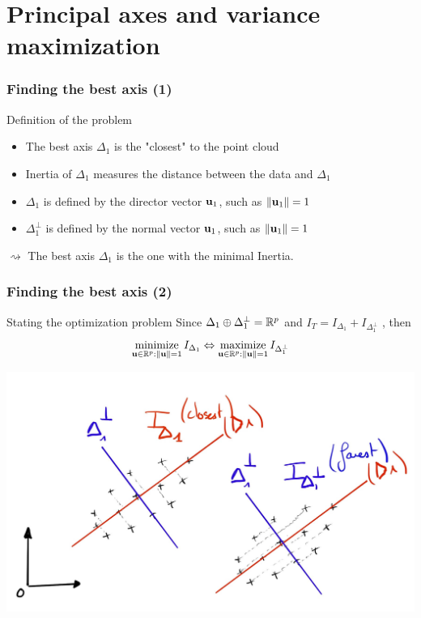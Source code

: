 \documentclass{beamer}\usepackage[]{graphicx}\usepackage[]{color}
\begin{document}
\section{Principal axes and variance maximization}

\begin{frame}
  \frametitle{Finding the best axis (1)}

  \begin{block}{Definition of the problem}
    \begin{itemize}
      \item The best axis $\Delta_1$ is the "closest" to the point cloud
      \item Inertia of $\Delta_1$ measures the distance between the data and $\Delta_1$
      \item $\Delta_1$ is defined by the director vector $\mathbf{u}_1$, such as $\| \mathbf{u}_1 \| = 1$
      \item $\Delta_1^\bot$ is defined by the normal  vector $\mathbf{u}_1$, such as $\| \mathbf{u}_1 \| = 1$
    \end{itemize}
    \alert{$\rightsquigarrow$ The best axis $\Delta_1$ is the one with the minimal Inertia.}
  \end{block}
  
\end{frame}

\begin{frame}
  \frametitle{Finding the best axis (2)}

  \begin{block}{Stating the optimization problem}
    Since $\Delta_1 \oplus \Delta_1^\bot = \mathbb{R}^p$ and $I_T = I_{\Delta_1} + I_{\Delta_1^\bot}$ , then
    \begin{equation*}
        \mathop{\mathrm{minimize}}_{\mathbf{u} \in \mathbb{R}^p: \|\mathbf{u}\| = 1} I_{\Delta_1} \Leftrightarrow \mathop{\mathrm{maximize}}_{\mathbf{u} \in \mathbb{R}^p: \|\mathbf{u}\| = 1} I_{\Delta_1^\bot}
    \end{equation*} 
  \end{block}  
  
  \includegraphics[width=.7\textwidth]{minimum_inertia}
  
\end{frame}
\end{document}
